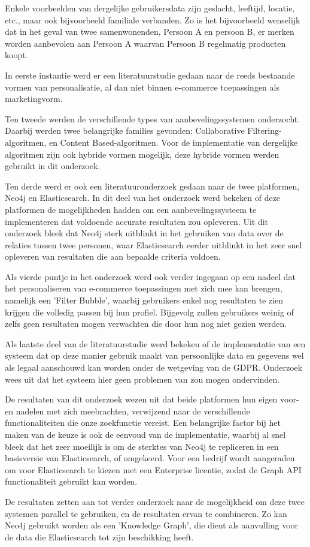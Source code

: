 Enkele voorbeelden van dergelijke gebruikersdata zijn geslacht, leeftijd, locatie, etc., maar ook bijvoorbeeld familiale verbanden. Zo is het bijvoorbeeld wenselijk dat in het geval van twee samenwonenden, Persoon A en persoon B, er merken worden aanbevolen aan Persoon A waarvan Persoon B regelmatig producten koopt.

In eerste instantie werd er een literatuurstudie gedaan naar de reeds bestaande vormen van personalisatie, al dan niet binnen e-commerce toepassingen als marketingvorm.

Ten tweede werden de verschillende types van aanbevelingssystemen onderzocht. Daarbij werden twee belangrijke families gevonden: Collaborative Filtering-algoritmen, en Content Based-algoritmen. Voor de implementatie van dergelijke algoritmen zijn ook hybride vormen mogelijk, deze hybride vormen werden gebruikt in dit onderzoek.

Ten derde werd er ook een literatuuronderzoek gedaan naar de twee platformen, Neo4j en Elasticsearch. In dit deel van het onderzoek werd bekeken of deze platformen de mogelijkheden hadden om een aanbevelingssysteem te implementeren dat voldoende accurate resultaten zou opleveren. Uit dit onderzoek bleek dat Neo4j sterk uitblinkt in het gebruiken van data over de relaties tussen twee personen, waar Elasticsearch eerder uitblinkt in het zeer snel opleveren van resultaten die aan bepaalde criteria voldoen.

Als vierde puntje in het onderzoek werd ook verder ingegaan op een nadeel dat het personaliseren van e-commerce toepassingen met zich mee kan brengen, namelijk een 'Filter Bubble', waarbij gebruikers enkel nog resultaten te zien krijgen die volledig passen bij hun profiel. Bijgevolg zullen gebruikers weinig of zelfs geen resultaten mogen verwachten die door hun nog niet gezien werden.

Als laatste deel van de literatuurstudie werd bekeken of de implementatie van een systeem dat op deze manier gebruik maakt van persoonlijke data en gegevens wel als legaal aanschouwd kan worden onder de wetgeving van de GDPR. Onderzoek wees uit dat het systeem hier geen problemen van zou mogen ondervinden.

De resultaten van dit onderzoek wezen uit dat beide platformen hun eigen voor- en nadelen met zich meebrachten, verwijzend naar de verschillende functionaliteiten die onze zoekfunctie vereist. Een belangrijke factor bij het maken van de keuze is ook de eenvoud van de implementatie, waarbij al snel bleek dat het zeer moeilijk is om de sterktes van Neo4j te repliceren in een basisversie van Elasticsearch, of omgekeerd. Voor een bedrijf wordt aangeraden om voor Elasticsearch te kiezen met een Enterprise licentie, zodat de Graph API functionaliteit gebruikt kan worden.

De resultaten zetten aan tot verder onderzoek naar de mogelijkheid om deze twee systemen parallel te gebruiken, en de resultaten ervan te combineren.  Zo kan Neo4j gebruikt worden als een 'Knowledge Graph', die dient als aanvulling voor de data die Elasticsearch tot zijn beschikking heeft. 


